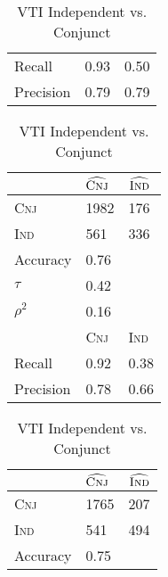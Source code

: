 \begin{table}[H]
\begin{floatrow}[2]
{\begin{tabular}{lll}
Recall               & 0.93               & 0.50                  \\
Precision            & 0.79               & 0.79 \\
                \bottomrule
                \end{tabular}}
    {\caption{VAI Independent vs. Conjunct}
      \label{vaiivcms}}
  \end{floatrow}
  \vspace*{1cm}
  \begin{floatrow}[2]
    \ttabbox%
    {                \begin{tabular}{lll}
                \toprule
                     & $\widehat{\textsc{Cnj}}$ & $\widehat{\textsc{Ind}}$ \\
                \midrule
\textsc{Cnj}         & 1982               & 176                    \\
\textsc{Ind}           & 561                & 336                    \\
                     \midrule
                     \midrule
Accuracy             & 0.76               &                       \\
$\tau$               & 0.42               &                       \\
$\rho^{2}$           & 0.16               &                       \\
                     \midrule
                     \midrule
                     & \textsc{Cnj}       & \textsc{Ind}           \\
Recall               & 0.92               & 0.38                  \\
Precision            & 0.78               & 0.66 \\
                \bottomrule
                \end{tabular}}
    {\caption{VTI Independent vs. Conjunct}
      \label{vtiivcms}}
    \hfill%
    \ttabbox%
        {                \begin{tabular}{lll}
                \toprule
                     & $\widehat{\textsc{Cnj}}$ & $\widehat{\textsc{Ind}}$ \\
                \midrule
\textsc{Cnj}         & 1765               & 207                    \\
\textsc{Ind}           & 541                & 494                    \\
                     \midrule
                     \midrule
Accuracy             & 0.75               &                       \\

\end{tabular}}
\end{floatrow}
\end{table}
